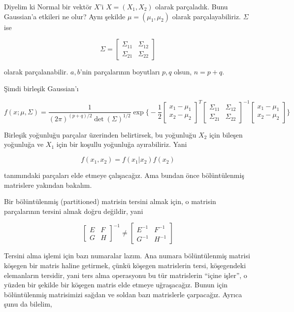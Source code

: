 \documentclass[12pt,fleqn]{article}\usepackage{../../common}
\begin{document}
Diyelim ki Normal bir vektör $X$'i $X = (X_1,X_2)$ olarak parçaladık. Bunu
Gaussian'a etkileri ne olur? Aynı şekilde $\mu = (\mu_1,\mu_2)$ olarak
parçalayabiliriz. $\Sigma$ ise

$$ \Sigma = 
\left[\begin{array}{rr}
\Sigma_{11} & \Sigma_{12}\\
\Sigma_{21} & \Sigma_{22}
\end{array}\right]
 $$

olarak parçalanabilir. $a,b$'nin parçalarının boyutları $p,q$ olsun, $n = p+q$.

Şimdi birleşik Gaussian'ı 

$$ f(x;\mu,\Sigma) = 
\frac{ 1}{(2\pi)^{(p+q)/2} \det(\Sigma)^{1/2}} 
\exp 
\bigg\{ 
-\frac{ 1}{2}
\left[\begin{array}{r}
x_1 - \mu_1\\
x_2 - \mu_2
\end{array}\right]^T
\left[\begin{array}{rr}
\Sigma_{11} & \Sigma_{12}\\
\Sigma_{21} & \Sigma_{22}
\end{array}\right]^{-1}
\left[\begin{array}{r}
x_1 - \mu_1\\
x_2 - \mu_2
\end{array}\right]
\bigg\}
 $$

Birleşik yoğunluğu parçalar üzerinden belirtirsek, bu yoğunluğu $X_2$ için
bileşen yoğunluğa ve $X_1$ için bir koşullu yoğunluğa ayırabiliriz. Yani 

$$ f(x_1,x_2) = f(x_1|x_2) f(x_2) $$

tanımındaki parçaları elde etmeye çalışacağız.  Ama bundan önce
bölüntülenmiş matrislere yakından bakalım. 

Bir bölüntülenmiş (partitioned) matrisin tersini almak için, o matrisin
parçalarının tersini almak doğru değildir, yani

$$ 
\left[\begin{array}{rr}
E & F \\
G & H
\end{array}\right] ^{-1} \ne
\left[\begin{array}{rr}
E^{-1} & F ^{-1}\\
G^{-1} & H^{-1}
\end{array}\right]  
 $$

Tersini alma işlemi için bazı numaralar lazım. Ana numara bölüntülenmiş matrisi 
köşegen bir matris haline getirmek, çünkü köşegen matrislerin tersi,
köşegendeki elemanların tersidir, yani ters alma operasyonu bu tür
matrislerin ``içine işler'', o yüzden bir şekilde bir köşegen matris
elde etmeye uğraşacağız. Bunun için bölüntülenmiş matrisimizi sağdan ve
soldan bazı matrislerle çarpacağız. Ayrıca şunu da bilelim, 
\end{document}
